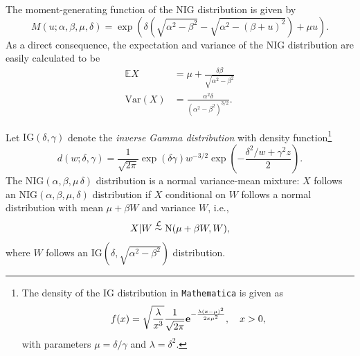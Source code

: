 The moment-generating function of the NIG distribution is given by
\begin{equation*}
  M(u; \alpha, \beta, \mu, \delta) = \exp\left( \delta
    \left(\sqrt{\alpha^2-\beta^2} - \sqrt{\alpha^2 - (\beta +
        u)^2}\right) + \mu u\right). 
\end{equation*}
As a direct consequence, the expectation and variance of the NIG
distribution are easily calculated to be
\begin{align}
  \label{eq:4}
  \mathbb E X &= \mu + 
                \frac{\delta \beta}{\sqrt{\alpha^2-\beta^2}}\\
  \label{eq:5}
  \text{Var}(X) &= \frac{\alpha^2\delta}{(\alpha^2-\beta^2)^{3/2}}.
\end{align}


Let $\text{IG}(\delta,\gamma)$ denote the {\em inverse Gamma
  distribution} with density function\footnote{%
  The density of the IG distribution in {\tt Mathematica} is given as
  \begin{equation*}
    f(x) = \sqrt{\frac{\lambda}{x^3}} \frac{1}{\sqrt{2\pi}}
    {\bf e}^{-\frac{\lambda(x-\mu)^2}{2 x\mu^2}},\quad x>0,
  \end{equation*}
  with parameters $\mu=\delta/\gamma$ and $\lambda=\delta^2$. 
  }%
\begin{equation}
  \label{eq:2}
  d(w; \delta, \gamma) = \frac{1}{\sqrt{2\pi}} \exp(\delta \gamma)
  w^{-3/2} \exp(-\frac{\delta^2/w + \gamma^2 z}{2}). 
\end{equation}
The $\text{NIG}(\alpha, \beta, \mu\, \delta)$ distribution is a normal
variance-mean mixture: $X$ follows an
$\text{NIG}(\alpha,\beta,\mu,\delta)$ distribution if $X$ conditional
on $W$ follows a normal distribution with mean $\mu+\beta W$ and
variance $W$, i.e., 
\begin{equation*}
  X|W\stackrel{\mathcal L}\sim {\rm N}(\mu + \beta W, W),
\end{equation*}
where $W$ follows an $\text{IG}(\delta, \sqrt{\alpha^2-\beta^2})$
distribution. 

